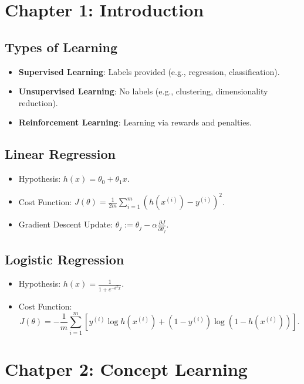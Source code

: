 \documentclass[10pt,a4paper]{article}
\begin{document}
\section*{Chapter 1: Introduction}
\subsection*{Types of Learning}
\begin{itemize}
	\item \textbf{Supervised Learning}: Labels provided (e.g., regression, classification).
	\item \textbf{Unsupervised Learning}: No labels (e.g., clustering, dimensionality reduction).
	\item \textbf{Reinforcement Learning}: Learning via rewards and penalties.
\end{itemize}

\subsection*{Linear Regression}
\begin{itemize}
    \item Hypothesis: \( h(x) = \theta_0 + \theta_1 x \).
    \item Cost Function: \( J(\theta) = \frac{1}{2m} \sum_{i=1}^{m} (h(x^{(i)}) - y^{(i)})^2 \).
    \item Gradient Descent Update: \( \theta_j := \theta_j - \alpha \frac{\partial J}{\partial \theta_j} \).
\end{itemize}

\subsection*{Logistic Regression}
\begin{itemize}
    \item Hypothesis: \( h(x) = \frac{1}{1 + e^{-\theta^T x}} \).
    \item Cost Function:
    \[
    J(\theta) = -\frac{1}{m} \sum_{i=1}^{m} [y^{(i)} \log h(x^{(i)}) + (1 - y^{(i)}) \log(1 - h(x^{(i)}))].
    \]
\end{itemize}
\section*{Chatper 2: Concept Learning}
\end{document}
